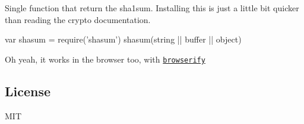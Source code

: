 Single function that return the sha1sum. Installing this is just a little bit quicker than reading the crypto documentation.


\begin{DoxyCode}
var shasum = require('shasum')
shasum(string || buffer || object)
\end{DoxyCode}


Oh yeah, it works in the browser too, with \href{https://npmjs.org/package/browserify}{\tt browserify}

\subsection*{License}

M\+IT 